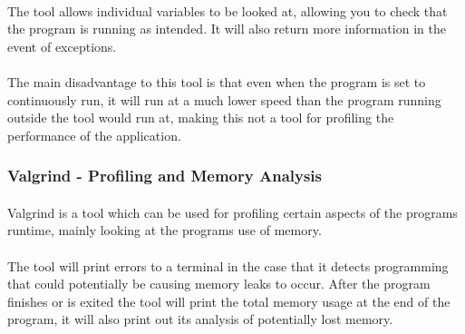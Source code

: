 \paragraph{}
The tool allows individual variables to be looked at, allowing you to check that the program is running as intended. It will also return more information in the event of exceptions.

\paragraph{}
The main disadvantage to this tool is that even when the program is set to continuously run, it will run at a much lower speed than the program running outside the tool would run at, making this not a tool for profiling the performance of the application.

\subsubsection{Valgrind - Profiling and Memory Analysis}
\paragraph{}
Valgrind is a tool which can be used for profiling certain aspects of the programs runtime, mainly looking at the programs use of memory.

\paragraph{}
The tool will print errors to a terminal in the case that it detects programming that could potentially be causing memory leaks to occur. After the program finishes or is exited the tool will print the total memory usage at the end of the program, it will also print out its analysis of potentially lost memory.

